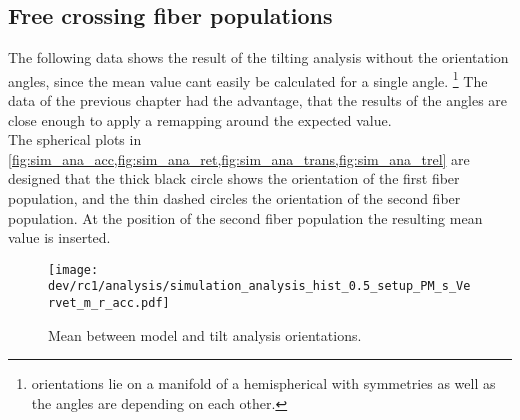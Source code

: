 \subsection{Free crossing fiber populations}
\label{sec:resFreeCross}
% 
The following data shows the result of the tilting analysis without the orientation angles, since the mean value cant easily be calculated for a single angle. \footnote{orientations lie on a manifold of a hemispherical with symmetries as well as the angles are depending on each other.}
The data of the previous chapter had the advantage, that the results of the angles are close enough to apply a remapping around the expected value.
\\
% 
The spherical plots in \cref{fig:sim_ana_acc,fig:sim_ana_ret,fig:sim_ana_trans,fig:sim_ana_trel} are designed that the thick black circle shows the orientation of the first fiber population, and the thin dashed circles the orientation of the second fiber population. 
At the position of the second fiber population the resulting mean value is inserted.
% 
% 
% 
\begin{figure}[!p]
\centering
\texttt{[image: dev/rc1/analysis/simulation\_analysis\_hist\_0.5\_setup\_PM\_s\_Vervet\_m\_r\_acc.pdf]}
\caption[Simulation acc]{Mean \acc{} between model and tilt analysis orientations.}
\label{fig:sim_ana_acc}
\end{figure}
% 
